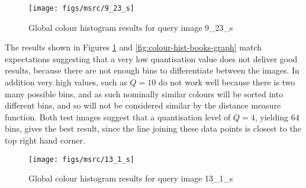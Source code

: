 \begin{figure}[ht]
	\begin{minipage}[]{0.3\linewidth}
		\centering
		\texttt{[image: figs/msrc/9\_23\_s]}
		\label{fig:colour-hist-sheep-img}
	\end{minipage}
	\begin{minipage}[]{0.7\linewidth}
		\centering
		 
		\prplotclose
		\label{fig:colour-hist-sheep}
	\end{minipage}
	\caption{Global colour histogram results for query image 9\_23\_s}
	\label{fig:colour-hist-sheep-graph}
\end{figure}

The results shown in Figures \ref{fig:colour-hist-sheep-graph} and \ref{fig:colour-hist-books-graph} match expectations suggesting that a very low quantisation value does not deliver good results, because there are not enough bins to differentiate between the images. In addition very high values, such as $Q=10$ do not work well because there is two many possible bins, and as such nominally similar colours will be sorted into different bins, and so will not be considered similar by the distance measure function. Both test images suggest that a quantisation level of $Q=4$, yielding $64$ bins, gives the best result, since the line joining these data points is closest to the top right hand corner.

\begin{figure}[ht]
	\begin{minipage}[]{0.3\linewidth}
		\centering
		\texttt{[image: figs/msrc/13\_1\_s]}
		\label{fig:colour-hist-books-img}
	\end{minipage}
	\begin{minipage}[]{0.7\linewidth}
		\centering
		 
		\prplotclose
		\label{fig:colour-hist-books-graph}
	\end{minipage}
	\caption{Global colour histogram results for query image 13\_1\_s}
	\label{fig:colour-hist-books}
\end{figure}

